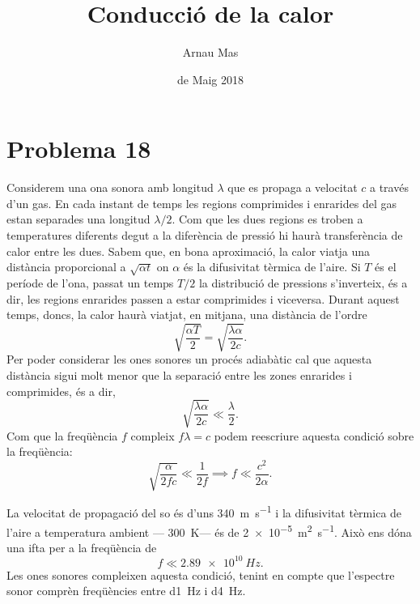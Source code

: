\documentclass[12pt]{article}
\title{\sffamily {\bfseries Entrega 3:} Conducció de la calor}
\author{\sffamily Arnau Mas}
\date{\sffamily 4 de Maig 2018}
\begin{document}
\maketitle
\section{Problema 18}
Considerem una ona sonora amb longitud \( \lambda \) que es propaga a velocitat \( c \) a través d'un gas. En cada instant de temps les regions comprimides i enrarides del gas estan separades una longitud \( \lambda/2 \). Com que les dues regions es troben a temperatures diferents degut a la diferència de pressió hi haurà transferència de calor entre les dues. Sabem que, en bona aproximació, la calor viatja una distància proporcional a \( \sqrt{\alpha t} \) on \( \alpha \) és la difusivitat tèrmica de l'aire. Si \( T \) és el període de l'ona, passat un temps \( T/2 \) la distribució de pressions s'inverteix, és a dir, les regions enrarides passen a estar comprimides i viceversa. Durant aquest temps, doncs, la calor haurà viatjat, en mitjana, una distància de l'ordre 
\begin{equation*}
 \sqrt{\frac{\alpha T}{2}} = \sqrt{\frac{\lambda \alpha}{2 c}}.
\end{equation*}
Per poder considerar les ones sonores un procés adiabàtic cal que aquesta distància sigui molt menor que la separació entre les zones enrarides i comprimides, és a dir, 
\begin{equation*}
\sqrt{\frac{\lambda \alpha}{2c}} \ll \frac{\lambda}{2}.
\end{equation*}
Com que la freqüència \( f \) compleix \( f \lambda = c \) podem reescriure aquesta condició sobre la freqüència:
\begin{equation*}
	\sqrt{\frac{\alpha}{2fc}} \ll \frac{1}{2f} \implies f \ll \frac{c^2}{2\alpha}.
\end{equation*}

La velocitat de propagació del so és d'uns \SI{340}{m.s^{-1}} i la difusivitat tèrmica de l'aire a temperatura ambient --- \SI{300}{K}--- és de \SI{2e-5}{m^{2}. s^{-1}}. Això ens dóna una ifta per a la freqüència de
\begin{equation*}
	f \ll \SI{2.89e10}{Hz}.
\end{equation*}
Les ones sonores compleixen aquesta condició, tenint en compte que l'espectre sonor comprèn freqüències entre \SI{d1}{Hz} i \SI{d4}{Hz}. 
\end{document}
